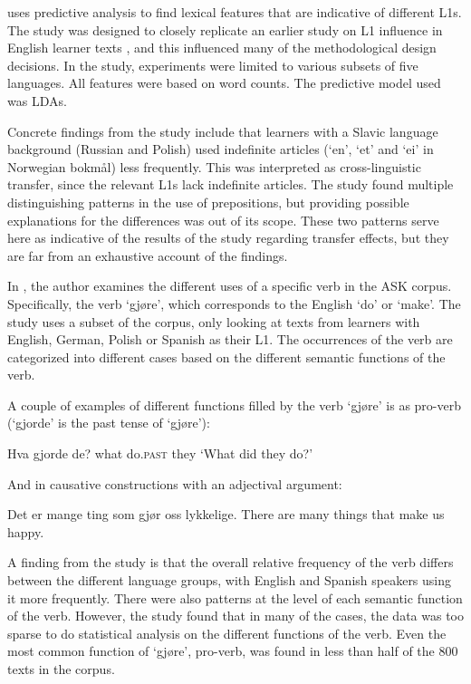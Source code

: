 \textcite{pepper2012} uses predictive analysis to find lexical features that
are indicative of different \acp{L1}. The study was designed to closely
replicate an earlier study on \ac{L1} influence in English learner texts
\autocite{jarvis2012detecting}, and this influenced many of the
methodological design decisions. In the \citeauthor{pepper2012} study,
experiments were limited to various subsets of five languages. All features
were based on word counts. The predictive model used was \acp{LDA}.

Concrete findings from the \citeauthor{pepper2012} study include that
learners with a Slavic language background (Russian and Polish) used
indefinite articles (`en', `et' and `ei' in Norwegian bokmål) less
frequently. This was interpreted as cross-linguistic transfer, since the
relevant \acp{L1} lack indefinite articles. The study found multiple
distinguishing patterns in the use of prepositions, but providing possible
explanations for the differences was out of its scope. These two patterns
serve here as indicative of the results of the study regarding transfer
effects, but they are far from an exhaustive account of the findings.

In \textcite{golden2016ask}, the author examines the different uses of a
specific verb in the ASK corpus. Specifically, the verb `gjøre', which
corresponds to the English `do' or `make'. The study uses a subset of the
corpus, only looking at texts from learners with English, German, Polish or
Spanish as their \ac{L1}. The occurrences of the verb are categorized into
different cases based on the different semantic functions of the verb.

A couple of examples of different functions filled by the verb `gjøre' is
as pro-verb (`gjorde' is the past tense of `gjøre'):

\begin{example}
\gll Hva  gjorde  de?
     what do.\textsc{past} they
\glt `What did they do?'
\glend
\end{example}

And in causative constructions with an adjectival argument:

\begin{example}
\gll Det   er  mange ting   som  gjør oss lykkelige.
     There are many  things that make us  happy.
\glt
\glend
\end{example}

A finding from the study is that the overall relative frequency of the verb
differs between the different language groups, with English and Spanish
speakers using it more frequently. There were also patterns at the level of
each semantic function of the verb. However, the study found that in many of
the cases, the data was too sparse to do statistical analysis on the
different functions of the verb. Even the most common function of `gjøre',
pro-verb, was found in less than half of the 800 texts in the corpus.

